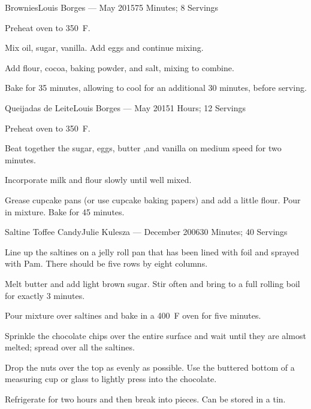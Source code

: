 \documentclass{article}
\begin{document}
\begin{recipe}{Brownies}{Louis Borges --- May 2015}{75 Minutes; 8 Servings}

   \newstep
   Preheat oven to 350\ \0F.

   Mix oil, sugar, vanilla.  Add eggs and continue mixing.

   Add flour, cocoa, baking powder, and salt, mixing to combine.

   \newstep
   Bake for 35 minutes, allowing to cool for an additional 30 minutes, before
   serving.

\end{recipe}

\begin{recipe}{Queijadas de Leite}{Louis Borges --- May 2015}{1 Hours; 12 Servings}

   \newstep
   Preheat oven to 350\ \0F.

   Beat together the sugar, eggs, butter ,and vanilla on medium speed for two minutes.

   Incorporate milk and flour slowly until well mixed.

   \newstep
   Grease cupcake pans (or use cupcake baking papers) and add a little flour.
   Pour in mixture.  Bake for 45 minutes.

\end{recipe}

\begin{recipe}{Saltine Toffee Candy}{Julie Kulesza --- December 2006}{30 Minutes; 40 Servings}

   Line up the saltines on a jelly roll pan that has been lined with foil and
   sprayed with Pam.  There should be five rows by eight columns.

   Melt butter and add light brown sugar.  Stir often and bring to a full
   rolling boil for exactly 3 minutes.

   \newstep
   Pour mixture over saltines and bake in a 400\ \0F oven for five minutes.

   Sprinkle the chocolate chips over the entire surface and wait until they are
   almost melted; spread over all the saltines.

   Drop the nuts over the top as evenly as possible. Use the buttered bottom of
   a measuring cup or glass to lightly press into the chocolate.

   \newstep
   Refrigerate for two hours and then break into pieces.  Can be stored in a
   tin.

\end{recipe}
\end{document}
